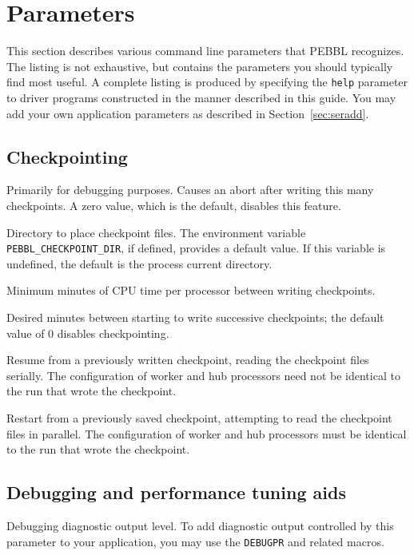 \section{Parameters}
\label{sec:param}
This section describes various command line parameters that PEBBL
recognizes.  The listing is not exhaustive, but contains the
parameters you should typically find most useful.  A complete listing
is produced by specifying the \texttt{help} parameter to driver
programs constructed in the manner described in this guide.  You may
add your own application parameters as described in Section~\ref{sec:seradd}.


\subsection{Checkpointing}
\vspace{-3ex}
 Primarily for
debugging purposes. Causes an abort after writing this many
checkpoints.  A zero value, which is the default, disables this feature.

 Directory to place checkpoint files.  The environment
variable \texttt{PEBBL\_CHECKPOINT\_DIR}, if defined, provides a
default value.  If this variable is undefined, the default is the process
current directory.

Minimum minutes of CPU time per processor between writing
checkpoints.  

Desired minutes between starting to write successive checkpoints; the default
value of $0$ disables checkpointing.

Resume from a previously written checkpoint, reading the checkpoint
files serially.  The configuration of worker and hub processors need
not be identical to the run that wrote the checkpoint.

 Restart from a previously saved
checkpoint, attempting to read the checkpoint files in parallel.  The
configuration of worker and hub processors must be identical to
the run that wrote the checkpoint.

\subsection{Debugging and performance tuning aids}
\label{sec:debugparams}
\vspace{-3ex}
Debugging diagnostic output level.  To add diagnostic output
controlled by this parameter to your application, you may use the
\texttt{DEBUGPR} and related macros.  

